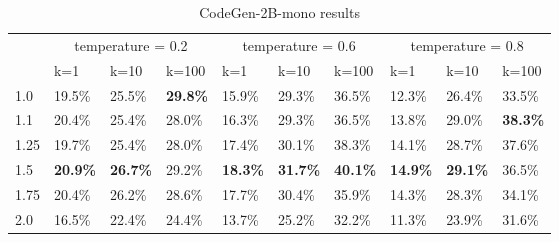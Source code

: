 \documentclass{article}
\begin{document}
\begin{table}[t]
    \centering
    \begin{tabular}{llllllllll}
        \toprule
         & \multicolumn{3}{c}{temperature = 0.2} & \multicolumn{3}{c}{temperature = 0.6} & \multicolumn{3}{c}{temperature = 0.8} \\
         \cmidrule(r){2-4} \cmidrule(r){5-7} \cmidrule(r){8-10}
         & k=1 & k=10 & k=100 & k=1 & k=10 & k=100 & k=1 & k=10 & k=100 \\
        \midrule
        1.0 & 19.5\% & 25.5\% & \textbf{29.8\%} & 15.9\% & 29.3\% & 36.5\% & 12.3\% & 26.4\% & 33.5\% \\
        1.1 & 20.4\% & 25.4\% & 28.0\% & 16.3\% & 29.3\% & 36.5\% & 13.8\% & 29.0\% & \textbf{38.3\%} \\
        1.25 & 19.7\% & 25.4\% & 28.0\% & 17.4\% & 30.1\% & 38.3\% & 14.1\% & 28.7\% & 37.6\% \\
        1.5 & \textbf{20.9\%} & \textbf{26.7\%} & 29.2\% & \textbf{18.3\%} & \textbf{31.7\%} & \textbf{40.1\%} & \textbf{14.9\%} & \textbf{29.1\%} & 36.5\% \\
        1.75 & 20.4\% & 26.2\% & 28.6\% & 17.7\% & 30.4\% & 35.9\% & 14.3\% & 28.3\% & 34.1\% \\
        2.0 & 16.5\% & 22.4\% & 24.4\% & 13.7\% & 25.2\% & 32.2\% & 11.3\% & 23.9\% & 31.6\% \\
        \bottomrule
    \end{tabular}
    \caption{CodeGen-2B-mono results}
    \label{tab:codegen-2b}
\end{table}
\end{document}
